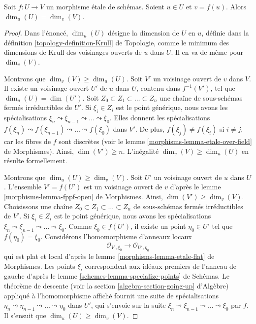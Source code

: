\begin{lemma}
\label{lemma-dimension-at-point-local}
Soit $f : U \to V$ un morphisme \'etale de schémas. Soient $u \in U$ et
$v = f(u)$. Alors $\dim_u(U) = \dim_v(V)$.
\end{lemma}

\begin{proof}
Dans l'énoncé, $\dim_u(U)$ désigne la dimension de $U$ en $u$, définie dans
la définition \ref{topology-definition-Krull} de Topologie, comme le minimum des
dimensions de Krull des voisinages ouverts de $u$ dans $U$. Il en va de même
pour $\dim_v(V)$.

\medskip\noindent
Montrons que $\dim_v(V) \geq \dim_u(U)$. Soit $V'$ un voisinage ouvert de
$v$ dans $V$. Il existe un voisinage ouvert $U'$ de $u$ dans $U$, contenu
dans $f^{-1}(V')$, tel que $\dim_u(U) = \dim(U')$. Soit
$Z_0 \subset Z_1 \subset \ldots \subset Z_n$ une chaîne de sous-schémas
fermés irréductibles de $U'$. Si $\xi_i \in Z_i$ est le point générique,
nous avons les spécialisations
$\xi_n \leadsto \xi_{n - 1} \leadsto \ldots \leadsto \xi_0$. Elles donnent
les spécialisations
$f(\xi_n) \leadsto f(\xi_{n - 1}) \leadsto \ldots \leadsto f(\xi_0)$ dans
$V'$. De plus, $f(\xi_j) \not = f(\xi_i)$ si $i \not = j$, car les fibres de
$f$ sont discrètes (voir le lemme
\ref{morphisms-lemma-etale-over-field} de Morphismes). Ainsi, $\dim(V') \geq n$.
L'inégalité $\dim_v(V) \geq \dim_u(U)$ en résulte formellement.

\medskip\noindent
Montrons que $\dim_u(U) \geq \dim_v(V)$. Soit $U'$ un voisinage ouvert de
$u$ dans $U$. L'ensemble $V' = f(U')$ est un voisinage ouvert de $v$ d'après
le lemme \ref{morphisms-lemma-fppf-open} de Morphismes. Ainsi,
$\dim(V') \geq \dim_v(V)$. Choisissons une chaîne
$Z_0 \subset Z_1 \subset \ldots \subset Z_n$ de sous-schémas fermés
irréductibles de $V'$. Si $\xi_i \in Z_i$ est le point générique, nous avons
les spécialisations
$\xi_n \leadsto \xi_{n - 1} \leadsto \ldots \leadsto \xi_0$. Comme
$\xi_0 \in f(U')$, il existe un point $\eta_0 \in U'$ tel que
$f(\eta_0) = \xi_0$. Considérons l'homomorphisme d'anneaux locaux
$$
\mathcal{O}_{V', \xi_0} \longrightarrow \mathcal{O}_{U', \eta_0}
$$
qui est plat et local d'après le lemme
\ref{morphisms-lemma-etale-flat} de Morphismes. Les points $\xi_i$ correspondent aux idéaux
premiers de l'anneau de gauche d'après le lemme
\ref{schemes-lemma-specialize-points} de Schémas. Le théorème de descente (voir la
section \ref{algebra-section-going-up} d'Algèbre) appliqué à l'homomorphisme affiché
fournit une suite de spécialisations
$\eta_n \leadsto \eta_{n - 1} \leadsto \ldots \leadsto \eta_0$ dans $U'$,
qui s'envoie sur la suite
$\xi_n \leadsto \xi_{n - 1} \leadsto \ldots \leadsto \xi_0$ par $f$.
Il s'ensuit que $\dim_u(U) \geq \dim_v(V)$.
\end{proof}

